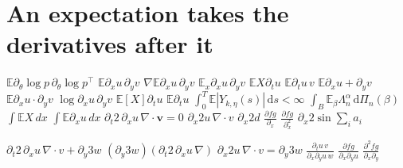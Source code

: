 \documentclass{article}
\begin{document}
\section{An expectation takes the derivatives after it}
$\mathbb{E}\partial_\theta\log p\,\partial_\theta\log p^\top$ $\mathbb{E}\partial_x u\,\partial_y v$ $\nabla\mathbb{E}\partial_x u\,\partial_y v$
$\mathbb{E}_x\partial_x u\,\partial_y v$ $\mathbb{E}X\partial_t u$ $\mathbb{E}\partial_t u\,v$ $\mathbb{E}\partial_x u+\partial_y v$ $\mathbb{E}\partial_x u\cdot\partial_y v$
$\log\partial_x u\,\partial_y v$ $\mathbb{E}[X]\partial_t u$ $\mathbb{E}\partial_t u$
$\int_{0}^{T}\mathbb{E}|Y_{k,\eta}(s)|\,\mathrm{d}s<\infty$ $\int_B\mathbb{E}_{\beta}\Lambda^{\alpha}_{n}\,\mathrm{d}\Pi_{n}(\beta)$ $\int\mathbb{E}X\,dx$ $\int\mathbb{E}\partial_x u\,dx$
$\partial_t 2\,\partial_x u\,\nabla\cdot\mathbf{v}=0$ $\partial_x 2u\,\nabla\cdot v$ $\partial_x 2d$ $\frac{\partial fg}{\partial_x}$
$\frac{\partial fg}{\partial_x^2}$ $\partial_x 2\sin\sum_i a_i$

$\partial_t 2\,\partial_x u\,\nabla\cdot v+\partial_y 3w$ $(\partial_y 3w)(\partial_t 2\,\partial_x u\,\nabla)$
$\partial_x 2u\,\nabla\cdot v=\partial_y 3w$ $\frac{\partial_t u\,v}{\partial_x\partial_y u\,w}$ $\frac{\partial fg}{\partial_x\partial_y u}$
$\frac{\partial^2 fg}{\partial_x\partial_y}$
\end{document}
